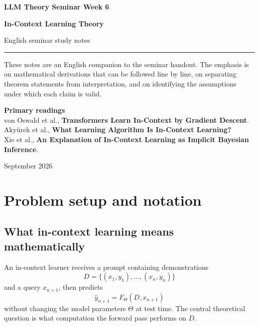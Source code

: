 \documentclass[11pt,a4paper,oneside,openany]{memoir}
\theoremstyle{definition}
\begin{document}
\begin{titlingpage}
\thispagestyle{empty}
\vspace*{1.2cm}
{\small\bfseries LLM Theory Seminar \hfill Week 6\par}
\vspace{1.4cm}
{\HUGE\bfseries In-Context Learning Theory\par}
\vspace{0.55cm}
{\large English seminar study notes\par}
\vspace{0.9cm}
\rule{\textwidth}{0.7pt}
\vspace{1.1cm}
\begin{minipage}{0.86\textwidth}
\small
These notes are an English companion to the seminar handout.  The emphasis is on
mathematical derivations that can be followed line by line, on separating theorem
statements from interpretation, and on identifying the assumptions under which each
claim is valid.
\end{minipage}
\vfill
{\small\textbf{Primary readings}\\[0.25em]
von Oswald et al., \textbf{Transformers Learn In-Context by Gradient Descent}.\\Aky\"urek et al., \textbf{What Learning Algorithm Is In-Context Learning?}\\Xie et al., \textbf{An Explanation of In-Context Learning as Implicit Bayesian Inference}.
\par}
\vspace{0.8cm}
{\small September 2026\par}
\end{titlingpage}
\tableofcontents*
\clearpage

\chapter{Problem setup and notation}
\section{What in-context learning means mathematically}
An in-context learner receives a prompt containing demonstrations
\[
D=\{(x_1,y_1),\ldots,(x_n,y_n)\}
\]
and a query $x_{n+1}$, then predicts
\[
\hat y_{n+1}=F_\Theta(D,x_{n+1})
\]
without changing the model parameters $\Theta$ at test time.  The central theoretical question is what computation the forward pass performs on $D$.
\end{document}
